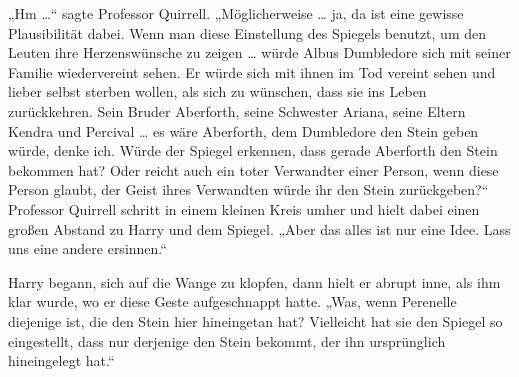 „Hm …“ sagte Professor Quirrell.
„Möglicherweise … ja, da ist eine gewisse Plausibilität dabei. Wenn man diese Einstellung des Spiegels benutzt, um den Leuten ihre Herzenswünsche zu zeigen … würde Albus Dumbledore sich mit seiner Familie wiedervereint sehen. Er würde sich mit ihnen im Tod vereint sehen und lieber selbst sterben wollen, als sich zu wünschen, dass sie ins Leben zurückkehren. Sein Bruder Aberforth, seine Schwester Ariana, seine Eltern Kendra und Percival … es wäre Aberforth, dem Dumbledore den Stein geben würde, denke ich. Würde der Spiegel erkennen, dass gerade Aberforth den Stein bekommen hat? Oder reicht auch ein toter Verwandter einer Person, wenn diese Person glaubt, der Geist ihres Verwandten würde ihr den Stein zurückgeben?“
Professor Quirrell schritt in einem kleinen Kreis umher und hielt dabei einen großen Abstand zu Harry und dem Spiegel.
„Aber das alles ist nur eine Idee. Lass uns eine andere ersinnen.“

Harry begann, sich auf die Wange zu klopfen, dann hielt er abrupt inne, als ihm klar wurde, wo er diese Geste aufgeschnappt hatte.
„Was, wenn Perenelle diejenige ist, die den Stein hier hineingetan hat? Vielleicht hat sie den Spiegel so eingestellt, dass nur derjenige den Stein bekommt, der ihn ursprünglich hineingelegt hat.“

